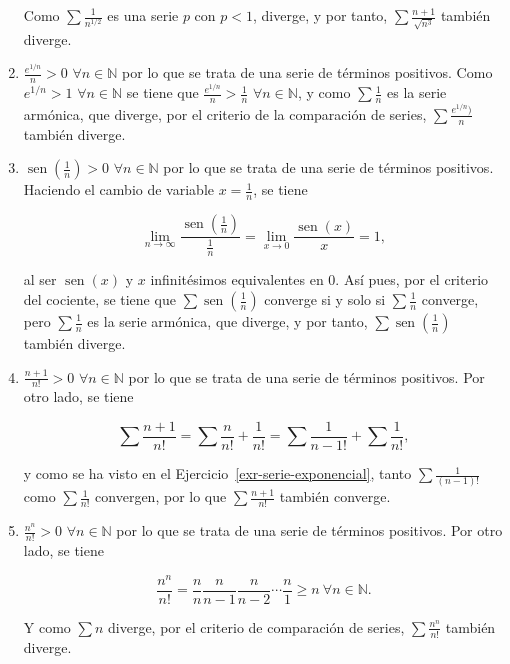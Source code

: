 \documentclass[
  a4paper,
]{scrreport}
\theoremstyle{definition}
\theoremstyle{remark}
\begin{document}
\begin{tcolorbox}
\begin{enumerate}
  Como \(\sum \frac{1}{n^{1/2}}\) es una serie \(p\) con \(p<1\),
  diverge, y por tanto, \(\sum \frac{n+1}{\sqrt{n^3}}\) también diverge.
\item
  \(\frac{e^{1/n}}{n}>0\) \(\forall n\in\mathbb{N}\) por lo que se trata
  de una serie de términos positivos. Como \(e^{1/n}>1\)
  \(\forall n\in\mathbb{N}\) se tiene que
  \(\frac{e^{1/n}}{n}>\frac{1}{n}\) \(\forall n\in\mathbb{N}\), y como
  \(\sum \frac{1}{n}\) es la serie armónica, que diverge, por el
  criterio de la comparación de series, \(\sum \frac{e^{1/n})}{n}\)
  también diverge.
\item
  \(\operatorname{sen}\left(\frac{1}{n}\right)>0\)
  \(\forall n\in\mathbb{N}\) por lo que se trata de una serie de
  términos positivos. Haciendo el cambio de variable \(x=\frac{1}{n}\),
  se tiene

  \[
   \lim_{n\to\infty}\frac{\operatorname{sen}\left(\frac{1}{n}\right)}{\frac{1}{n}} = \lim_{x\to 0}\frac{\operatorname{sen}(x)}{x} = 1,
   \]

  al ser \(\operatorname{sen}(x)\) y \(x\) infinitésimos equivalentes en
  \(0\). Así pues, por el criterio del cociente, se tiene que
  \(\sum \operatorname{sen}\left(\frac{1}{n}\right)\) converge si y solo
  si \(\sum \frac{1}{n}\) converge, pero \(\sum \frac{1}{n}\) es la
  serie armónica, que diverge, y por tanto,
  \(\sum \operatorname{sen}\left(\frac{1}{n}\right)\) también diverge.
\item
  \(\frac{n+1}{n!}>0\) \(\forall n\in\mathbb{N}\) por lo que se trata de
  una serie de términos positivos. Por otro lado, se tiene

  \[
   \sum \frac{n+1}{n!} = \sum \frac{n}{n!}+\frac{1}{n!} = \sum \frac{1}{{n-1}!}+\sum \frac{1}{n!},
   \]

  y como se ha visto en el Ejercicio~\ref{exr-serie-exponencial}, tanto
  \(\sum \frac{1}{(n-1)!}\) como \(\sum \frac{1}{n!}\) convergen, por lo
  que \(\sum \frac{n+1}{n!}\) también converge.
\item
  \(\frac{n^n}{n!}>0\) \(\forall n\in\mathbb{N}\) por lo que se trata de
  una serie de términos positivos. Por otro lado, se tiene

  \[ \frac{n^n}{n!} = \frac{n}{n} \frac{n}{n-1} \frac{n}{n-2} \cdots \frac{n}{1}\geq n \ \forall n\in \mathbb{N}.
   \]

  Y como \(\sum n\) diverge, por el criterio de comparación de series,
  \(\sum \frac{n^n}{n!}\) también diverge.
\end{enumerate}

\end{tcolorbox}
\end{document}
